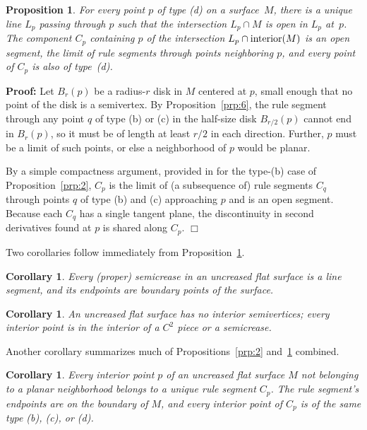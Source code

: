 \documentclass[11pt,letterpaper]{article}
\newtheorem{proposition}[theorem]{Proposition}
\newtheorem{corollary}[theorem]{Corollary}
\newenvironment{proof}{\noindent\textbf{Proof: }\ignorespaces}
  {\hspace*{\fill}$\Box$\medskip}
\newcommand\interior{\mathop{\rm interior}}
\begin{document}
\begin{proposition}\label{prp:3}
  For every point $p$ of type (d) on a surface~$M$,
  there is a unique line $L_p$ passing through $p$
  such that the intersection $L_p \cap M$ is open in $L_p$ at~$p$.
  The component $C_p$ containing $p$ of the
  intersection $L_p \cap \interior(M)$ is an open segment,
  the limit of rule segments through points neighboring $p$,
  and every point of $C_p$ is also of type~(d).
\end{proposition}
\begin{proof}
  Let $B_r(p)$ be a radius-$r$ disk in $M$ centered at $p$,
  small enough that no point of the disk is a semivertex.
  By Proposition~\ref{prp:6}, the rule segment
  through any point $q$ of type (b) or (c) in the
  half-size disk $B_{r/2}(p)$ cannot end in $B_r(p)$,
  so it must be of length at least $r/2$ in each direction.
  Further, $p$ must be a limit of such points,
  or else a neighborhood of $p$ would be planar.

  By a simple compactness argument, provided in \cite{Spivak-1979} for the
  type-(b) case of Proposition~\ref{prp:2}, $C_p$ is the limit of (a
  subsequence of) rule segments $C_q$ through points $q$ of type (b)
  and (c) approaching $p$ and is an open segment.  Because each $C_q$
  has a single tangent plane, the discontinuity in second derivatives
  found at $p$ is shared along $C_p$.
\end{proof}

Two corollaries follow immediately from Proposition~\ref{prp:3}.

\begin{corollary}\label{cory:2}
  Every (proper) semicrease in an uncreased flat surface is a line segment,
  and its endpoints are boundary points of the surface.
\end{corollary}

\begin{corollary}\label{cory:3}
  An uncreased flat surface has no interior semivertices;
  every interior point is in the interior of a $C^2$ piece or a semicrease.
\end{corollary}

Another corollary summarizes much of Propositions~\ref{prp:2}
and~\ref{prp:3} combined.

\begin{corollary}\label{cory:1}
  Every interior point $p$ of an uncreased flat surface $M$ not
  belonging to a planar neighborhood belongs to a unique rule segment
  $C_p$.  The rule segment's endpoints are on the boundary of $M$, and
  every interior point of $C_p$ is of the same type (b), (c), or (d).
\end{corollary}
\end{document}
